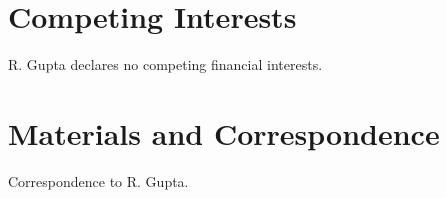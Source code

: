 \documentclass[reprint,longbibliography]{revtex4-1} %
\begin{document}
\section{Competing Interests}
R. Gupta declares no competing financial interests. \\

\section{Materials and Correspondence} 
Correspondence to R. Gupta.


  
\end{document}
